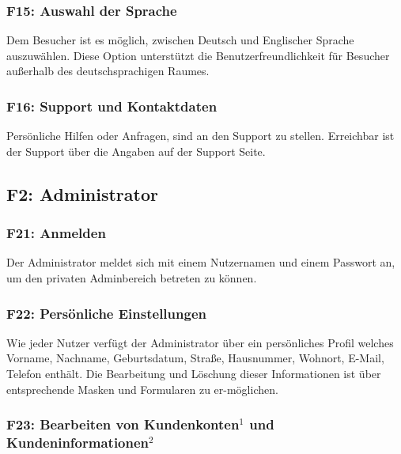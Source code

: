 \documentclass[10pt,a4paper]{scrartcl}
\begin{document}
%

\subsubsection*{F15: Auswahl der Sprache}

Dem Besucher ist es möglich, zwischen Deutsch und Englischer Sprache auszuwählen. Diese Option unterstützt die Benutzerfreundlichkeit für Besucher außerhalb des deutschsprachigen Raumes.

\subsubsection*{F16: Support und Kontaktdaten}

Persönliche Hilfen oder Anfragen, sind an den Support zu stellen. Erreichbar ist der Support \"uber die Angaben auf der Support Seite.


\subsection{F2: Administrator}

\subsubsection*{F21: Anmelden}

Der Administrator meldet sich mit einem Nutzernamen und einem Passwort an, um den privaten Adminbereich betreten zu können.

\subsubsection*{F22: Persönliche Einstellungen}

Wie jeder Nutzer verfügt der Administrator über ein persönliches Profil welches Vorname, Nachname, Geburtsdatum, Straße, Hausnummer, Wohnort, E-Mail, Telefon enthält. Die Bearbeitung und Löschung dieser Informationen ist über entsprechende Masken und Formularen zu er-möglichen.

\subsubsection*{F23: Bearbeiten von Kundenkonten$^1$ und Kundeninformationen$^2$}
\end{document}
